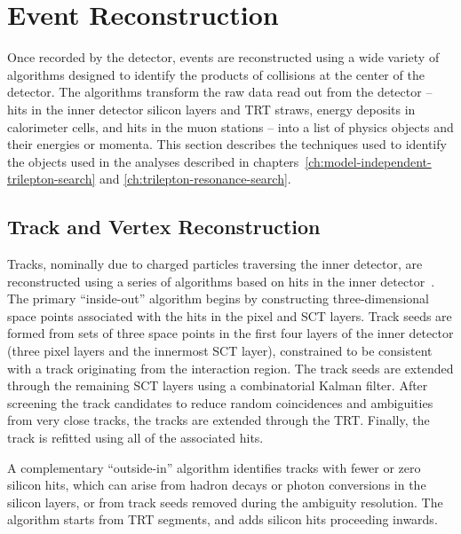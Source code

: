 \chapter{Event Reconstruction}\label{ch:event-reconstruction}

Once recorded by the detector, events are reconstructed using a wide variety of algorithms designed to identify the products of collisions at the center of the detector. The algorithms transform the raw data read out from the detector -- hits in the inner detector silicon layers and TRT straws, energy deposits in calorimeter cells, and hits in the muon stations -- into a list of physics objects and their energies or momenta. This section describes the techniques used to identify the objects used in the analyses described in chapters~\ref{ch:model-independent-trilepton-search} and \ref{ch:trilepton-resonance-search}. 

\section{Track and Vertex Reconstruction}\label{sec:event-reconstruction-track-vertex}
Tracks, nominally due to charged particles traversing the inner detector, are reconstructed using a series of algorithms based on hits in the inner detector~\cite{Cornelissen:2007vba,TheATLASCollaboration:2010vw,TheATLASCollaboration:2012tja}.
The primary ``inside-out'' algorithm begins by constructing three-dimensional space points associated with the hits in the pixel and SCT layers. Track seeds are formed from sets of three space points in the first four layers of the inner detector (three pixel layers and the innermost SCT layer), constrained to be consistent with a track originating from the interaction region. The track seeds are extended through the remaining SCT layers using a combinatorial Kalman filter. After screening the track candidates to reduce random coincidences and ambiguities from very close tracks, the tracks are extended through the TRT. Finally, the track is refitted using all of the associated hits. 

A complementary ``outside-in'' algorithm identifies tracks with fewer or zero silicon hits, which can arise from hadron decays or photon conversions in the silicon layers, or from track seeds removed during the ambiguity resolution. The algorithm starts from TRT segments, and adds silicon hits proceeding inwards. 

